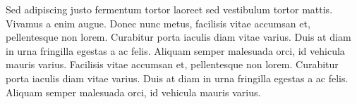Sed adipiscing justo fermentum tortor laoreet sed vestibulum tortor mattis.
Vivamus a enim augue. Donec nunc metus, facilisis vitae accumsan et,
pellentesque non lorem. Curabitur porta iaculis diam vitae varius. Duis at diam
in urna fringilla egestas a ac felis. Aliquam semper malesuada orci, id vehicula
mauris varius. Facilisis vitae accumsan et, pellentesque non lorem. Curabitur 
porta iaculis diam vitae varius. Duis at diam in urna fringilla egestas a ac 
felis. Aliquam semper malesuada orci, id vehicula mauris varius.


